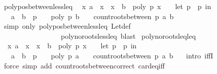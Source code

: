 \begin{isabellebody}
\endisatagproof
{\isafoldproof}%
%
\isadelimproof
\isanewline
%
\endisadelimproof
\isanewline
{}\isamarkupfalse%
\ poly{\isacharunderscore}pos{\isacharunderscore}between{\isacharunderscore}less{\isacharunderscore}leq{\isacharcolon}\isanewline
\ \ {\isachardoublequoteopen}{\isacharparenleft}{\isasymforall}x{\isachardot}\ a\ {\isacharless}\ x\ {\isasymand}\ x\ {\isasymle}\ b\ {\isasymlongrightarrow}\ poly\ p\ x\ {\isachargreater}\ {}{\isacharparenright}\ {\isasymlongleftrightarrow}\ {\isacharparenleft}let\ p\ {\isacharequal}\ p\ in\isanewline
\ \ \ {\isacharparenleft}a\ {\isasymge}\ b\ {\isasymor}\ {\isacharparenleft}p\ {\isasymnoteq}\ {}\ {\isasymand}\ poly\ p\ b\ {\isachargreater}\ {}\ {\isasymand}\ count{\isacharunderscore}roots{\isacharunderscore}between\ p\ a\ b\ {\isacharequal}\ {}{\isacharparenright}{\isacharparenright}{\isacharparenright}{\isachardoublequoteclose}\isanewline
%
\isadelimproof
\ \ %
\endisadelimproof
%
\isatagproof
{}\isamarkupfalse%
\ {\isacharparenleft}simp\ only{\isacharcolon}\ poly{\isacharunderscore}pos{\isacharunderscore}between{\isacharunderscore}less{\isacharunderscore}leq\ Let{\isacharunderscore}def\ \isanewline
\ \ \ \ \ \ \ \ \ \ \ \ \ \ \ \ \ poly{\isacharunderscore}no{\isacharunderscore}roots{\isacharunderscore}less{\isacharunderscore}leq{\isacharcomma}\ blast{\isacharparenright}%
\endisatagproof
{\isafoldproof}%
%
\isadelimproof
\isanewline
%
\endisadelimproof
\isanewline
\isanewline
{}\isamarkupfalse%
\ poly{\isacharunderscore}no{\isacharunderscore}roots{\isacharunderscore}leq{\isacharunderscore}leq{\isacharcolon}\isanewline
\ \ {\isachardoublequoteopen}{\isacharparenleft}{\isasymforall}x{\isachardot}\ a\ {\isasymle}\ x\ {\isasymand}\ x\ {\isasymle}\ b\ {\isasymlongrightarrow}\ poly\ p\ x\ {\isasymnoteq}\ {}{\isacharparenright}\ {\isasymlongleftrightarrow}\ {\isacharparenleft}let\ p\ {\isacharequal}\ p\ in\isanewline
\ \ \ {\isacharparenleft}a\ {\isachargreater}\ b\ {\isasymor}\ {\isacharparenleft}p\ {\isasymnoteq}\ {}\ {\isasymand}\ poly\ p\ a\ {\isasymnoteq}\ {}\ {\isasymand}\ count{\isacharunderscore}roots{\isacharunderscore}between\ p\ a\ b\ {\isacharequal}\ {}{\isacharparenright}{\isacharparenright}{\isacharparenright}{\isachardoublequoteclose}\isanewline
%
\isadelimproof
%
\endisadelimproof
%
\isatagproof
{}\isamarkupfalse%
\ {\isacharparenleft}intro\ iffI{\isacharparenright}\isanewline
{}\isamarkupfalse%
\ {\isacharparenleft}force\ simp\ add{\isacharcolon}\ count{\isacharunderscore}roots{\isacharunderscore}between{\isacharunderscore}correct\ card{\isacharunderscore}eq{\isacharunderscore}{}{\isacharunderscore}iff{\isacharparenright}\isanewline

\end{isabellebody}
